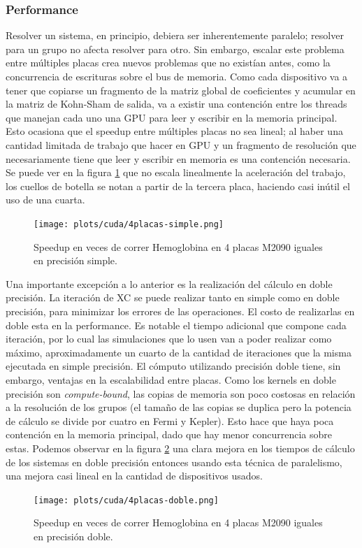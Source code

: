 \subsubsection{Performance}
\label{cuda-multiplaca}

Resolver un sistema, en principio, debiera ser inherentemente paralelo; resolver para un grupo
no afecta resolver para otro. Sin embargo, escalar este problema entre m\'ultiples placas crea
nuevos problemas que no exist\'ian antes, como la concurrencia de escrituras sobre el bus de memoria.
Como cada dispositivo va a tener que copiarse un fragmento de la matriz global de coeficientes
y acumular en la matriz de Kohn-Sham de salida, va a existir una contenci\'on entre los threads que manejan
cada uno una GPU para leer y escribir en la memoria principal. Esto ocasiona que el speedup entre
m\'ultiples placas no sea lineal; al haber una cantidad limitada de trabajo que hacer en GPU y un fragmento de
resoluci\'on que necesariamente tiene que leer y escribir en memoria es una contenci\'on necesaria. Se puede
ver en la figura \ref{fig:4placas-simple} que no escala linealmente la aceleraci\'on del trabajo, los cuellos
de botella se notan a partir de la tercera placa, haciendo casi in\'util el uso de una cuarta.

\begin{figure}[htbp]
   \centering
   \texttt{[image: plots/cuda/4placas-simple.png]}
   \caption{Speedup en veces de correr Hemoglobina en 4 placas M2090 iguales en precisi\'on simple.}
   \label{fig:4placas-simple}
\end{figure}

Una importante excepci\'on a lo anterior es la realizaci\'on del c\'alculo en doble precisi\'on. La iteraci\'on
de XC se puede realizar tanto en simple como en doble precisi\'on, para minimizar los
errores de las operaciones. El costo de realizarlas en doble esta en la performance. Es notable
el tiempo adicional que compone cada iteraci\'on, por lo cual las simulaciones que lo usen van
a poder realizar como m\'aximo, aproximadamente un cuarto de la cantidad de iteraciones que la misma ejecutada en simple precisi\'on.
El c\'omputo utilizando precisi\'on doble tiene, sin embargo, ventajas en la escalabilidad entre placas.
Como los kernels en doble precisi\'on son \textit{compute-bound}, las copias de memoria son poco costosas
en relaci\'on a la resoluci\'on de los grupos (el tama\~no de las copias se duplica pero la potencia de c\'alculo se divide
por cuatro en Fermi y Kepler). Esto hace que haya poca contenci\'on en la memoria principal,
dado que hay menor concurrencia sobre estas. Podemos observar en la figura \ref{fig:4placas-doble} una clara mejora en los tiempos
de c\'alculo de los sistemas en doble precisi\'on entonces usando esta t\'ecnica de paralelismo, una mejora casi
lineal en la cantidad de dispositivos usados.

\begin{figure}[htbp]
   \centering
   \texttt{[image: plots/cuda/4placas-doble.png]}
   \caption{Speedup en veces de correr Hemoglobina en 4 placas M2090 iguales en precisi\'on doble.}
   \label{fig:4placas-doble}
\end{figure}

